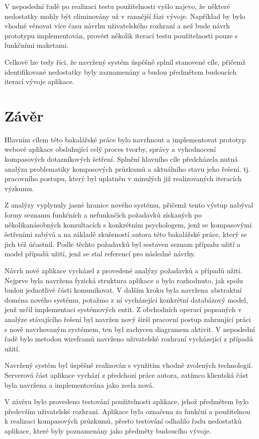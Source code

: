 V neposlední řadě po realizaci testu použitelnosti vyšlo najevo, že některé
nedostatky mohly být eliminovány už v rannější fázi vývoje. Například by bylo
vhodné věnovat více času návrhu uživatelského rozhraní a než bude návrh prototypu 
implementován, provést několik iterací testu použitelnosti pouze s funkčními maketami.

Celkově lze tedy říci, že navržený systém úspěšně splnil stanovené cíle, přičemž 
identifikované nedostatky byly zaznamenány a budou předmětem budoucích iterací
vývoje aplikace.


\chapter{Závěr}
Hlavním cílem této bakalářské práce bylo navrhnout a implementovat prototyp webové aplikace
obsluhující celý proces tvorby, správy a vyhodnocení kompasových dotazníkových šetření.
Splnění hlavního cíle předcházela nutná analýza problematiky kompasových průzkumů
a aktuálního stavu jeho řešení, tj. pracovního postupu, který byl uplatněn v minulých již realizovaných
iteracích výzkumu.

Z analýzy vyplynuly jasné hranice nového systému, přičemž tento výstup nabýval formy seznamu funkčních a
nefunknčích požadavků získaných po několikanásobných konzultacích s konkrétním psychologem, jenž 
se kompasovými šetřeními zabývá a na základě zkušeností autora této bakalářské práce, který se jich též účastnil. 
Podle těchto požadavků byl sestaven seznam případu užití a model případů užití, jenž se stal referencí pro
následné návrhy.

Návrh nové aplikace vycházel z provedené analýzy požadavků a případů užití. Nejprve byla
navržena fyzická struktura aplikace a bylo rozhodnuto, jak spolu budou jednotlivé části komunikovat.
V dalším kroku byla navržena abstraktní doména nového systému, potažmo z ní vycházející konkrétní 
databázový model, jenž určil implementaci systémových entit. Z obchodních operací popsaných v analýze
stávajícího řešení byl navržen nový širší pracovní postup zahrnující práci s nově navrhovaným systémem, ten
byl zachycen diagramem aktivit. V neposlední řadě bylo metodou wireframů navrženo uživatelské rozhraní 
vycházející z případů užití.

Navržený systém byl úspěšně realizován s využitím vhodně zvolených technologií. 
Serverová část aplikace vychází z předchozí práce autora, zatímco klientská část byla navržena 
a implementována jako zcela nová.

V závěru bylo provedeno testování použitelnosti aplikace, jehož předmětem bylo především uživatelské rozhraní.
Aplikace byla označena za funkční a použitelnou k realizaci kompasových průzkumů, přesto 
testování odhalilo řadu nedostatků aplikace, které byly poznamenány jako předměty budoucího vývoje.



 